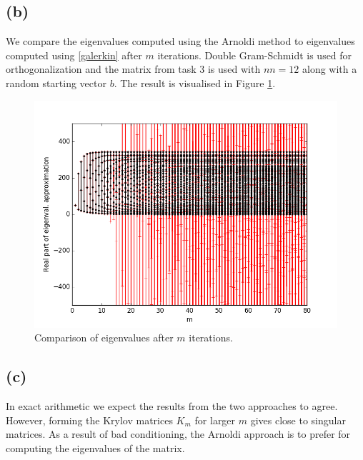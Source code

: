\subsection{(b)}
We compare the eigenvalues computed using the Arnoldi method to eigenvalues computed using \eqref{galerkin} after $m$ iterations. Double Gram-Schmidt is used for orthogonalization and the matrix from task 3 is used with $nn=12$ along with a random starting vector $b$. The result is visualised in Figure \ref{res}.
\begin{figure}[h]
\centering
\includegraphics[scale=0.5]{../task4/eigenArnoldi.png}
\caption{Comparison of eigenvalues after $m$ iterations.}
\label{res}
\end{figure}
\subsection{(c)}
In exact arithmetic we expect the results from the two approaches to agree. However, forming the Krylov matrices $K_m$ for larger $m$ gives close to singular matrices. As a result of bad conditioning, the Arnoldi approach is to prefer for computing the eigenvalues of the matrix.

